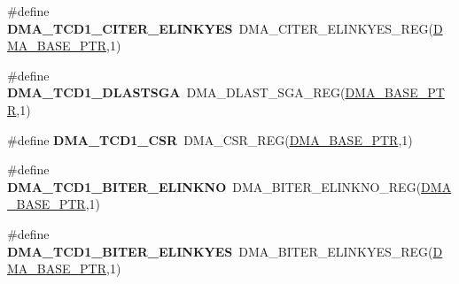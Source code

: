 \begin{DoxyCompactItemize}
\item 
\hypertarget{group___d_m_a___register___accessor___macros_ga93fe722e1649c6b4bc4c6bccecdda99f}{}\#define {\bfseries D\+M\+A\+\_\+\+T\+C\+D1\+\_\+\+C\+I\+T\+E\+R\+\_\+\+E\+L\+I\+N\+K\+Y\+E\+S}~D\+M\+A\+\_\+\+C\+I\+T\+E\+R\+\_\+\+E\+L\+I\+N\+K\+Y\+E\+S\+\_\+\+R\+E\+G(\hyperlink{group___d_m_a___peripheral_ga6997fbc1b1973e9f27170217a3bd6f22}{D\+M\+A\+\_\+\+B\+A\+S\+E\+\_\+\+P\+T\+R},1)\label{group___d_m_a___register___accessor___macros_ga93fe722e1649c6b4bc4c6bccecdda99f}

\item 
\hypertarget{group___d_m_a___register___accessor___macros_ga8e7ae95d1847471177772eff5d38b78b}{}\#define {\bfseries D\+M\+A\+\_\+\+T\+C\+D1\+\_\+\+D\+L\+A\+S\+T\+S\+G\+A}~D\+M\+A\+\_\+\+D\+L\+A\+S\+T\+\_\+\+S\+G\+A\+\_\+\+R\+E\+G(\hyperlink{group___d_m_a___peripheral_ga6997fbc1b1973e9f27170217a3bd6f22}{D\+M\+A\+\_\+\+B\+A\+S\+E\+\_\+\+P\+T\+R},1)\label{group___d_m_a___register___accessor___macros_ga8e7ae95d1847471177772eff5d38b78b}

\item 
\hypertarget{group___d_m_a___register___accessor___macros_gacad240efa4ab3711d61d1b82c5eedae2}{}\#define {\bfseries D\+M\+A\+\_\+\+T\+C\+D1\+\_\+\+C\+S\+R}~D\+M\+A\+\_\+\+C\+S\+R\+\_\+\+R\+E\+G(\hyperlink{group___d_m_a___peripheral_ga6997fbc1b1973e9f27170217a3bd6f22}{D\+M\+A\+\_\+\+B\+A\+S\+E\+\_\+\+P\+T\+R},1)\label{group___d_m_a___register___accessor___macros_gacad240efa4ab3711d61d1b82c5eedae2}

\item 
\hypertarget{group___d_m_a___register___accessor___macros_ga898031f3c7ec06acd31e0daee2d983d3}{}\#define {\bfseries D\+M\+A\+\_\+\+T\+C\+D1\+\_\+\+B\+I\+T\+E\+R\+\_\+\+E\+L\+I\+N\+K\+N\+O}~D\+M\+A\+\_\+\+B\+I\+T\+E\+R\+\_\+\+E\+L\+I\+N\+K\+N\+O\+\_\+\+R\+E\+G(\hyperlink{group___d_m_a___peripheral_ga6997fbc1b1973e9f27170217a3bd6f22}{D\+M\+A\+\_\+\+B\+A\+S\+E\+\_\+\+P\+T\+R},1)\label{group___d_m_a___register___accessor___macros_ga898031f3c7ec06acd31e0daee2d983d3}

\item 
\hypertarget{group___d_m_a___register___accessor___macros_ga0484b8606e5656a358ba3a3a1e7f7623}{}\#define {\bfseries D\+M\+A\+\_\+\+T\+C\+D1\+\_\+\+B\+I\+T\+E\+R\+\_\+\+E\+L\+I\+N\+K\+Y\+E\+S}~D\+M\+A\+\_\+\+B\+I\+T\+E\+R\+\_\+\+E\+L\+I\+N\+K\+Y\+E\+S\+\_\+\+R\+E\+G(\hyperlink{group___d_m_a___peripheral_ga6997fbc1b1973e9f27170217a3bd6f22}{D\+M\+A\+\_\+\+B\+A\+S\+E\+\_\+\+P\+T\+R},1)\label{group___d_m_a___register___accessor___macros_ga0484b8606e5656a358ba3a3a1e7f7623}


\end{DoxyCompactItemize}
